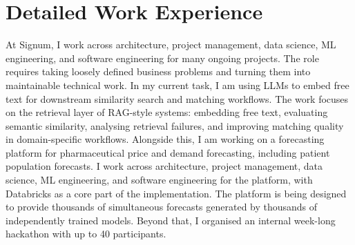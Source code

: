 \documentclass[11pt,a4paper]{moderncv}
\begin{document}
\newpage

\section{Detailed Work Experience}

\label{sec:signum}
 {
    At Signum, I work across architecture, project management, data science, ML engineering, and software engineering for many ongoing projects. The role requires taking loosely defined business problems and turning them into maintainable technical work.
    \newline\hspace*{2em}
    In my current task, I am using LLMs to embed free text for downstream similarity search and matching workflows. The work focuses on the retrieval layer of RAG-style systems: embedding free text, evaluating semantic similarity, analysing retrieval failures, and improving matching quality in domain-specific workflows.
    \newline\hspace*{2em}
    Alongside this, I am working on a forecasting platform for pharmaceutical price and demand forecasting, including patient population forecasts. I work across architecture, project management, data science, ML engineering, and software engineering for the platform, with Databricks as a core part of the implementation. The platform is being designed to provide thousands of simultaneous forecasts generated by thousands of independently trained models.
    \newline\hspace*{2em}
    Beyond that, I organised an internal week-long hackathon with up to 40 participants.
}{}

\label{sec:valcon}
\end{document}
